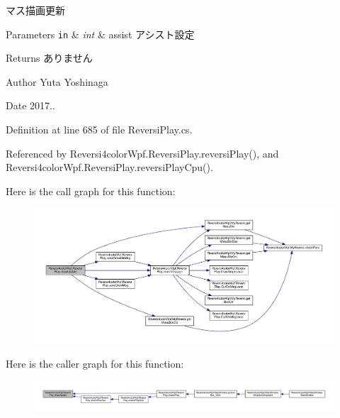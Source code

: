 マス描画更新 


\begin{DoxyParams}[1]{Parameters}
\mbox{\tt in}  & {\em int} & assist アシスト設定 \\
\hline
\end{DoxyParams}
\begin{DoxyReturn}{Returns}
ありません 
\end{DoxyReturn}
\begin{DoxyAuthor}{Author}
Yuta Yoshinaga 
\end{DoxyAuthor}
\begin{DoxyDate}{Date}
2017.. 
\end{DoxyDate}


Definition at line 685 of file Reversi\+Play.\+cs.



Referenced by Reversi4color\+Wpf.\+Reversi\+Play.\+reversi\+Play(), and Reversi4color\+Wpf.\+Reversi\+Play.\+reversi\+Play\+Cpu().



Here is the call graph for this function\+:
\nopagebreak
\begin{figure}[H]
\begin{center}
\leavevmode
\includegraphics[width=350pt]{class_reversi4color_wpf_1_1_reversi_play_af579d0b931ddc4bb8e07f37254e08625_cgraph}
\end{center}
\end{figure}




Here is the caller graph for this function\+:
\nopagebreak
\begin{figure}[H]
\begin{center}
\leavevmode
\includegraphics[width=350pt]{class_reversi4color_wpf_1_1_reversi_play_af579d0b931ddc4bb8e07f37254e08625_icgraph}
\end{center}
\end{figure}


